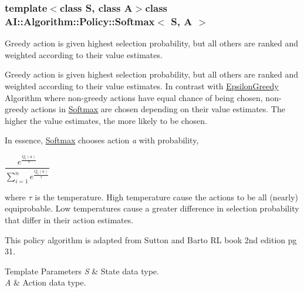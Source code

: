 \subsubsection*{template$<$class S, class A$>$class A\+I\+::\+Algorithm\+::\+Policy\+::\+Softmax$<$ S, A $>$}

Greedy action is given highest selection probability, but all others are ranked and weighted according to their value estimates. 

Greedy action is given highest selection probability, but all others are ranked and weighted according to their value estimates. In contrast with \hyperlink{classAI_1_1Algorithm_1_1Policy_1_1EpsilonGreedy}{Epsilon\+Greedy} Algorithm where non-\/greedy actions have equal chance of being chosen, non-\/greedy actions in \hyperlink{classAI_1_1Algorithm_1_1Policy_1_1Softmax}{Softmax} are chosen depending on their value estimates. The higher the value estimates, the more likely to be chosen.

In essence, \hyperlink{classAI_1_1Algorithm_1_1Policy_1_1Softmax}{Softmax} chooses action {\itshape a} with probability,

$\dfrac{e^{\frac{Q_t(a)}{\tau}}}{\sum_{i=1}^n e^{\frac{Q_t(a)}{\tau}}}$

where $\tau$ is the temperature. High temperature cause the actions to be all (nearly) equiprobable. Low temperatures cause a greater difference in selection probability that differ in their action estimates.

This policy algorithm is adapted from Sutton and Barto R\+L book 2nd edition pg 31.


\begin{DoxyTemplParams}{Template Parameters}
{\em S} & State data type. \\
\hline
{\em A} & Action data type. \\
\hline
\end{DoxyTemplParams}


